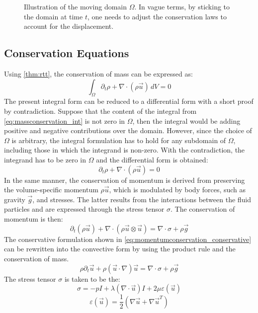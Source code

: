 \begin{figure}[ht]
	\centering
	
	\caption[Continuum in motion]{Illustration of the moving domain $\Omega$. In vague terms, by sticking to the domain at time $t$, one needs to adjust the conservation laws to account for the displacement.}\label{fig:reynolds_transport_theorem}
\end{figure}


\subsection{Conservation Equations}
Using \autoref{thm:rtt}, the conservation of mass can be expressed as:
\begin{equation}
	\int_\Omega \partial_{t}\rho + \nabla\cdot(\rho\vec{u})\,dV = 0
	\label{eq:massconservation_int}
\end{equation}
The present integral form can be reduced to a differential form with a short proof by contradiction. Suppose that the content of the integral from \autoref{eq:massconservation_int} is not zero in $\Omega$, then the integral would be adding positive and negative contributions over the domain. However, since the choice of $\Omega$ is arbitrary, the integral formulation has to hold for any subdomain of $\Omega$, including those in which the integrand is non-zero. With the contradiction, the integrand has to be zero in $\Omega$ and the differential form is obtained:
\begin{equation}
	\partial_{t}\rho + \nabla\cdot(\rho\vec{u}) = 0
	\label{eq:massconservation}
\end{equation}
In the same manner, the conservation of momentum is derived from preserving the volume-specific momentum $\rho\vec{u}$, which is modulated by body forces, such as gravity $\vec{g}$, and stresses. The latter results from the interactions between the fluid particles and are expressed through the stress tensor $\sigma$. The conservation of momentum is then:
\begin{equation}
	\partial_t (\rho\vec{u}) + \nabla\cdot(\rho\vec{u}\otimes\vec{u}) = \nabla\cdot\sigma + \rho\vec{g}
	\label{eq:momentumconservation_conservative}
\end{equation}
The conservative formulation shown in \autoref{eq:momentumconservation_conservative} can be rewritten into the convective form by using the product rule and the conservation of mass.
\begin{equation}
	\rho\partial_t\vec{u} + \rho(\vec{u}\cdot\nabla)\vec{u} = \nabla\cdot\sigma + \rho\vec{g}
	\label{eq:momentumconservation_convective}
\end{equation}
The stress tensor $\sigma$ is taken to be the:\\
\begin{equation}
	\sigma =-pI+\lambda(\nabla \cdot \vec{u})I+ 2\mu \varepsilon(\vec{u})
	\label{eq:stress}
\end{equation}
\begin{equation}
	\varepsilon(\vec{u}) = \frac{1}{2}(\nabla \vec{u}+\nabla \vec{u}^T)
	\label{eq:rate_of_strain}
\end{equation}

